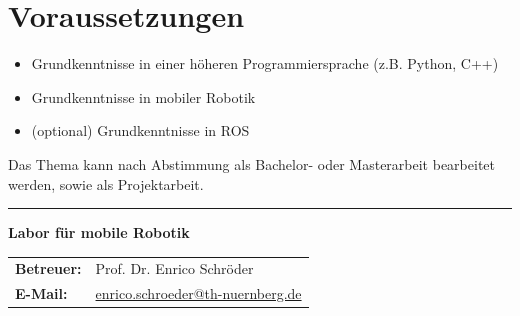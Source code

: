 \documentclass{ohm_project_description}
\begin{document}
\section*{Voraussetzungen}
\begin{itemize}[leftmargin=0.5cm]
    \setlength\itemsep{.1em}
    \item Grundkenntnisse in einer höheren Programmiersprache (z.B. Python, C++)
    \item Grundkenntnisse in mobiler Robotik
    \item (optional) Grundkenntnisse in ROS
\end{itemize}

\vspace{0.5cm}
Das Thema kann nach Abstimmung als Bachelor- oder Masterarbeit bearbeitet werden, sowie als Projektarbeit. 


\vfill
\textcolor{ohm_red}{\rule{\linewidth}{0.4mm}}
\textbf{\textcolor{ohm_red}{Labor für mobile Robotik}} \\
\begin{tabular}{@{}ll}
\textbf{Betreuer:} & Prof. Dr. Enrico Schröder \\
\textbf{E-Mail:}   & \href{mailto:enrico.schroeder@th-nuernberg.de}{enrico.schroeder@th-nuernberg.de} \\
\end{tabular}
\end{document}
